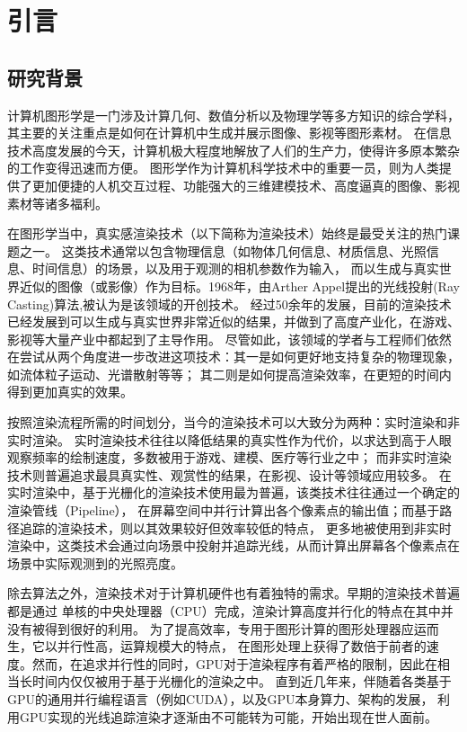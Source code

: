 \chapter{引言}
\label{cha:introduction}

\section{研究背景}

计算机图形学是一门涉及计算几何、数值分析以及物理学等多方知识的综合学科，其主要的关注重点是如何在计算机中生成并展示图像、影视等图形素材。
在信息技术高度发展的今天，计算机极大程度地解放了人们的生产力，使得许多原本繁杂的工作变得迅速而方便。
图形学作为计算机科学技术中的重要一员，则为人类提供了更加便捷的人机交互过程、功能强大的三维建模技术、高度逼真的图像、影视素材等诸多福利。

在图形学当中，真实感渲染技术（以下简称为渲染技术）始终是最受关注的热门课题之一。
这类技术通常以包含物理信息（如物体几何信息、材质信息、光照信息、时间信息）的场景，以及用于观测的相机参数作为输入，
而以生成与真实世界近似的图像（或影像）作为目标。1968年，由Arther Appel提出的光线投射(Ray Casting)算法\cite{Appel:1968:TSM:1468075.1468082},被认为是该领域的开创技术。
经过50余年的发展，目前的渲染技术已经发展到可以生成与真实世界非常近似的结果，并做到了高度产业化，在游戏、影视等大量产业中都起到了主导作用。
尽管如此，该领域的学者与工程师们依然在尝试从两个角度进一步改进这项技术：其一是如何更好地支持复杂的物理现象，如流体粒子运动、光谱散射等等；
其二则是如何提高渲染效率，在更短的时间内得到更加真实的效果。

按照渲染流程所需的时间划分，当今的渲染技术可以大致分为两种：实时渲染和非实时渲染。
实时渲染技术往往以降低结果的真实性作为代价，以求达到高于人眼观察频率的绘制速度，多数被用于游戏、建模、医疗等行业之中；
而非实时渲染技术则普遍追求最具真实性、观赏性的结果，在影视、设计等领域应用较多。
在实时渲染中，基于光栅化的渲染技术使用最为普遍，该类技术往往通过一个确定的渲染管线（Pipeline），
在屏幕空间中并行计算出各个像素点的输出值；而基于路径追踪的渲染技术，则以其效果较好但效率较低的特点，
更多地被使用到非实时渲染中，这类技术会通过向场景中投射并追踪光线，从而计算出屏幕各个像素点在场景中实际观测到的光照亮度。

除去算法之外，渲染技术对于计算机硬件也有着独特的需求。早期的渲染技术普遍都是通过
单核的中央处理器（CPU）完成，渲染计算高度并行化的特点在其中并没有被得到很好的利用。
为了提高效率，专用于图形计算的图形处理器应运而生，它以并行性高，运算规模大的特点，
在图形处理上获得了数倍于前者的速度。然而，在追求并行性的同时，GPU对于渲染程序有着严格的限制，因此在相当长时间内仅仅被用于基于光栅化的渲染之中。
直到近几年来，伴随着各类基于GPU的通用并行编程语言（例如CUDA），以及GPU本身算力、架构的发展，
利用GPU实现的光线追踪渲染才逐渐由不可能转为可能，开始出现在世人面前。

